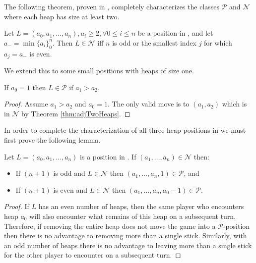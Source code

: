 \documentclass[letter,10pt]{article}
\begin{document}
The following theorem, proven in \cite{DBLP:journals/tcs/DucheneR14}, completely characterizes the classes $\mathcal{P}$ and $\mathcal{N}$ where each heap has size at least two.

\begin{theorem}\label{thm:adjNim}
Let $L = (a_0, a_1, \ldots, a_n),a_i\geq 2,  \forall 0\leq i\leq n$ be a position in , and let $a_-=\min\{a_i\}_0^n$. Then $L\in \mathcal{N}$ iff $n$ is odd or the smallest index $j$ for which $a_j=a_-$ is even.
\end{theorem}

We extend this to some small positions with heaps of size one. 

\begin{theorem}\label{thm:adjThreeHeaps1}
If $a_0=1$ then $L\in \mathcal{P}$ if $a_1>a_2$.
\end{theorem}
\begin{proof}
Assume $a_1>a_2$ and $a_0=1$. The only valid move is to $(a_1,a_2)$ which is in $\mathcal{N}$ by Theorem \ref{thm:adjTwoHeaps}. 
\end{proof}

In order to complete the characterization of all three heap positions in  we must first prove the following lemma.

\begin{lemma}\label{lem:adjStrategy}
Let $L=(a_0,a_1,\ldots ,a_n)$ is a position in . If $(a_1,\ldots ,a_n)\in \mathcal{N}$ then:
\begin{itemize}
	\item If $(n+1)$ is odd and $L\in \mathcal{N}$ then $(a_1,\ldots ,a_n, 1)\in \mathcal{P}$, and 
	\item If $(n+1)$ is even and $L\in \mathcal{N}$ then $(a_1,\ldots ,a_n, a_0-1)\in \mathcal{P}$.
\end{itemize}
\end{lemma}
\begin{proof}
If $L$ has an even number of heaps, then the same player who encounters heap $a_0$ will also encounter what remains of this heap on a subsequent turn. Therefore, if removing the entire heap does not move the game into a $\mathcal{P}$-position then there is no advantage to removing more than a single stick. Similarly, with an odd number of heaps there is no advantage to leaving more than a single stick for the other player to encounter on a subsequent turn.
\end{proof}
\end{document}
